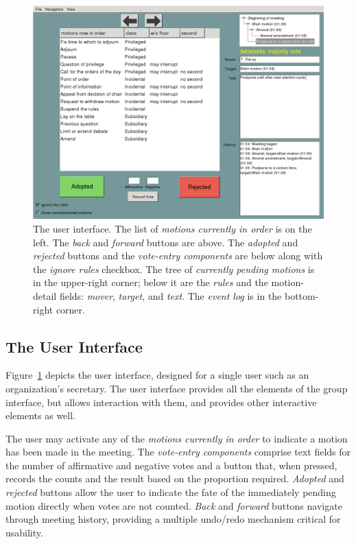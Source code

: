 \documentclass{acm_proc_article-sp}
\begin{document}
\begin{figure}[t]
\includegraphics[scale=.46]{user}
\caption{The user interface. The list of \emph{motions currently in order} is on the left. The \emph{back} and \emph{forward} buttons are above. The \emph{adopted} and \emph{rejected} buttons and the \emph{vote-entry components} are below along with the \emph{ignore rules} checkbox. The tree of \emph{currently pending motions} is in the upper-right corner; below it are the \emph{rules} and the motion-detail fields: \emph{mover}, \emph{target}, and \emph{text}. The \emph{event log} is in the bottom-right corner.}
\label{fig:user-interface}
\end{figure}

\subsection{The User Interface}

Figure~\ref{fig:user-interface} depicts the user interface, designed for a single user such as an organization's secretary. The user interface provides all the elements of the group interface, but allows interaction with them, and provides other interactive elements as well.

The user may activate any of the \emph{motions currently in order} to indicate a motion has been made in the meeting. The \emph{vote-entry components} comprise text fields for the number of affirmative and negative votes and a button that, when pressed, records the counts and the result based on the proportion required. \emph{Adopted} and \emph{rejected} buttons allow the user to indicate the fate of the immediately pending motion directly when votes are not counted. \emph{Back} and \emph{forward} buttons navigate through meeting history, providing a multiple undo/redo mechanism critical for usability.
\end{document}
